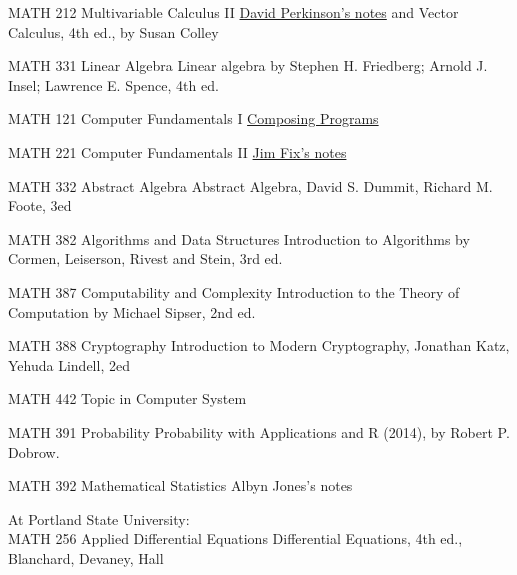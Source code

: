 \documentclass[10pt,a4paper]{article}
\begin{document}
    \inlineheadsection
  {MATH 212 Multivariable Calculus II}
  {\href{http://people.reed.edu/~davidp/homepage/211.pdf}{David Perkinson's notes} and Vector Calculus, 4th ed., by Susan Colley}
  \vspace{0.5em}
  
    
  \inlineheadsection
  {MATH 331 Linear Algebra}
  {	Linear algebra by Stephen H. Friedberg; Arnold J. Insel; Lawrence E. Spence, 4th ed.}
  \vspace{0.5em}
  
  
   \inlineheadsection
  {MATH 121 Computer Fundamentals I}
  {\href{http://www.composingprograms.com/}{Composing Programs}}
  \vspace{0.5em}
  
   \inlineheadsection
  {MATH 221 Computer Fundamentals II}
  {\href{https://jimfix.github.io/math221/index.html}{Jim Fix's notes}}
  \vspace{0.5em}
  
   \inlineheadsection
  {MATH 332 Abstract Algebra}
  {Abstract Algebra, David S. Dummit, Richard M. Foote, 3ed}
  \vspace{0.5em}  
  
   \inlineheadsection
  {MATH 382 Algorithms and Data Structures}
  {Introduction to Algorithms by Cormen, Leiserson, Rivest and Stein, 3rd ed.}
  \vspace{0.5em}
  
   \inlineheadsection
  {MATH 387 Computability and Complexity}
  {Introduction to the Theory of Computation by Michael Sipser, 2nd ed.}
  \vspace{0.5em}
  
   \inlineheadsection
  {MATH 388 Cryptography}
  {Introduction to Modern Cryptography, Jonathan Katz, Yehuda Lindell, 2ed}
  \vspace{0.5em}  
  
   \inlineheadsection
  {MATH 442 Topic in Computer System}
  {}
  \vspace{0.5em}
    
  
   \inlineheadsection
  {MATH 391 Probability}
  {Probability with Applications and R (2014), by Robert P. Dobrow.}
  \vspace{0.5em}
  
   \inlineheadsection
  {MATH 392 Mathematical Statistics}
  {Albyn Jones's notes}
  \vspace{0.5em}
   
   \vspace{1.0em}
   
   \headedsubsection
  {At Portland State University: \\}{}{}
  \inlineheadsection
  {MATH 256 Applied Differential Equations}
  {Differential Equations, 4th ed., Blanchard, Devaney, Hall}
  \vspace{0.5em}
  
\end{document}
